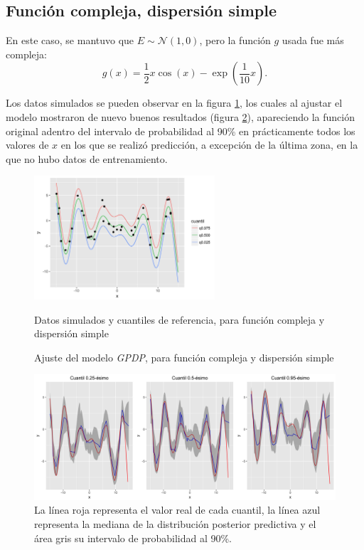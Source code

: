 \subsection{Funci\'on compleja, dispersi\'on simple}

En este caso, se mantuvo que $E \sim \mathcal{N}(1,0)$, pero la funci\'on $g$ usada fue m\'as compleja:
\begin{equation*}
    g(x) = \frac{1}{2} x \cos(x) - \exp\left(\frac{1}{10}x\right).
\end{equation*}

Los datos simulados se pueden observar en la figura \ref{sample_cgse}, los cuales al ajustar el modelo mostraron de nuevo buenos resultados (figura \ref{fitted_cgse}), apareciendo la funci\'on original adentro del intervalo de probabilidad al 90\% en pr\'acticamente todos los valores de $x$ en los que se realiz\'o predicci\'on, a excepci\'on de la \'ultima zona, en la que no hubo datos de entrenamiento.

\begin{figure}[H]
	\centering
	\caption{Datos simulados y cuantiles de referencia, para funci\'on compleja y dispersi\'on simple}
	\includegraphics[width=0.60\textwidth]{Figures/Simulation/complex_g_simple_error/sample.png}
	\label{sample_cgse}
\end{figure}

\begin{figure}[H]
	\centering
	\caption{Ajuste del modelo \textit{GPDP}, para funci\'on compleja y dispersi\'on simple}
	\includegraphics[width=\textwidth]{Figures/Simulation/complex_g_simple_error/fitted_models.png}
	\captionsetup{singlelinecheck=off, font=footnotesize}
    \caption*{La l\'inea roja representa el valor real de cada cuantil, la l\'inea azul representa la mediana de la distribuci\'on posterior predictiva y el \'area gris su intervalo de probabilidad al 90\%.}
	\label{fitted_cgse}
\end{figure}

